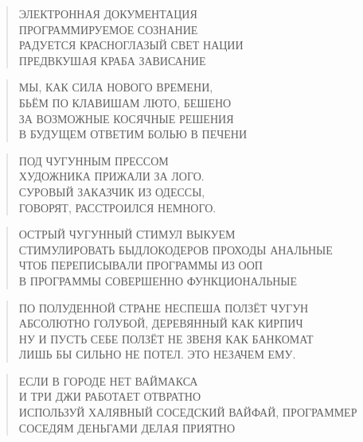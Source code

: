 \poemtitle{***}
\begin{verse}
ЭЛЕКТРОННАЯ ДОКУМЕНТАЦИЯ\\
ПРОГРАММИРУЕМОЕ СОЗНАНИЕ\\
РАДУЕТСЯ КРАСНОГЛАЗЫЙ СВЕТ НАЦИИ\\
ПРЕДВКУШАЯ КРАБА ЗАВИСАНИЕ
\end{verse}

\poemtitle{***}
\begin{verse}
МЫ, КАК СИЛА НОВОГО ВРЕМЕНИ,\\
БЬЁМ ПО КЛАВИШАМ ЛЮТО, БЕШЕНО\\
ЗА ВОЗМОЖНЫЕ КОСЯЧНЫЕ РЕШЕНИЯ\\
В БУДУЩЕМ ОТВЕТИМ БОЛЬЮ В ПЕЧЕНИ
\end{verse}

\poemtitle{***}
\begin{verse}
ПОД ЧУГУННЫМ ПРЕССОМ\\
ХУДОЖНИКА ПРИЖАЛИ ЗА ЛОГО.\\
СУРОВЫЙ ЗАКАЗЧИК ИЗ ОДЕССЫ,\\
ГОВОРЯТ, РАССТРОИЛСЯ НЕМНОГО.
\end{verse}

\poemtitle{***}
\begin{verse}
ОСТРЫЙ ЧУГУННЫЙ СТИМУЛ ВЫКУЕМ\\
СТИМУЛИРОВАТЬ БЫДЛОКОДЕРОВ ПРОХОДЫ АНАЛЬНЫЕ\\
ЧТОБ ПЕРЕПИСЫВАЛИ ПРОГРАММЫ ИЗ ООП\\
В ПРОГРАММЫ СОВЕРШЕННО ФУНКЦИОНАЛЬНЫЕ
\end{verse}

\poemtitle{***}
\begin{verse}
ПО ПОЛУДЕННОЙ СТРАНЕ НЕСПЕША ПОЛЗЁТ ЧУГУН\\
АБСОЛЮТНО ГОЛУБОЙ, ДЕРЕВЯННЫЙ КАК КИРПИЧ\\
НУ И ПУСТЬ СЕБЕ ПОЛЗЁТ НЕ ЗВЕНЯ КАК БАНКОМАТ\\
ЛИШЬ БЫ СИЛЬНО НЕ ПОТЕЛ. ЭТО НЕЗАЧЕМ ЕМУ.
\end{verse}

\poemtitle{***}
\begin{verse}
ЕСЛИ В ГОРОДЕ НЕТ ВАЙМАКСА\\
И ТРИ ДЖИ РАБОТАЕТ ОТВРАТНО\\
ИСПОЛЬЗУЙ ХАЛЯВНЫЙ СОСЕДСКИЙ ВАЙФАЙ, ПРОГРАММЕР\\
СОСЕДЯМ ДЕНЬГАМИ ДЕЛАЯ ПРИЯТНО
\end{verse}

